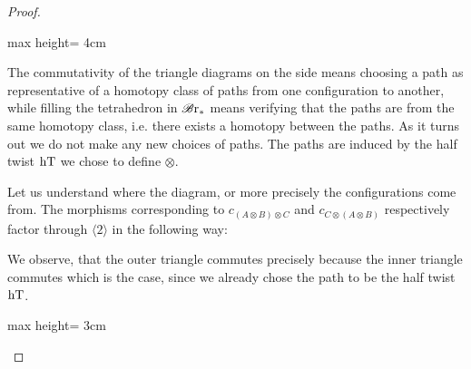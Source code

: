 \begin{proof}
\begin{center}
\begin{adjustbox}{max height= 4cm}
        \end{adjustbox}
    \end{center}
    The commutativity of the triangle diagrams on the side means choosing a path
    as representative of a homotopy class of paths from one configuration to
    another, while filling the tetrahedron in $\mathscr{B} \text{r}_{\ast}$ means verifying that the
    paths are from the same homotopy class, i.e. there exists a homotopy between
    the paths. As it turns out we do not make any new choices of paths. The
    paths are induced by the half twist $\operatorname{hT}$ we chose to define $\otimes$.

    Let us understand where the diagram, or more precisely the configurations
    come from. The morphisms corresponding to $c_{(A \otimes B) \otimes C}$ and
    $c_{C \otimes (A \otimes B)}$ respectively factor through $\langle 2
    \rangle$ in the following way:
    \begin{center}
    \end{center}
    We observe, that the outer triangle commutes precisely because the inner
    triangle commutes which is the case, since we already chose the path to be
    the half twist $\operatorname{hT}$.
    \begin{center}
    \begin{adjustbox}{max height= 3cm}
\end{adjustbox}
\end{center}
\end{proof}
